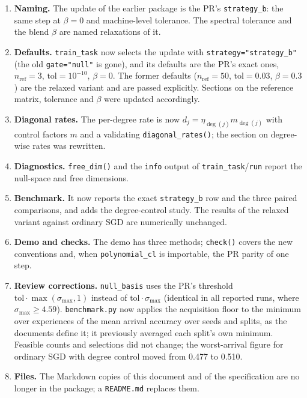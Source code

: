 \documentclass[11pt,a4paper]{article}
\newcommand{\code}[1]{\texttt{#1}}
\begin{document}
\begin{enumerate}
\item \textbf{Naming.} The update of the earlier package is the PR's \code{strategy\_b}: the same step at $\beta=0$ and machine-level tolerance. The spectral tolerance and the blend $\beta$ are named relaxations of it.
\item \textbf{Defaults.} \code{train\_task} now selects the update with \code{strategy="strategy\_b"} (the old \code{gate="null"} is gone), and its defaults are the PR's exact ones, $n_{\text{ref}}=3$, $\text{tol}=10^{-10}$, $\beta=0$. The former defaults ($n_{\text{ref}}=50$, $\text{tol}=0.03$, $\beta=0.3$) are the relaxed variant and are passed explicitly. Sections on the reference matrix, tolerance and $\beta$ were updated accordingly.
\item \textbf{Diagonal rates.} The per-degree rate is now $d_j=\eta_{\deg(j)}m_{\deg(j)}$ with control factors $m$ and a validating \code{diagonal\_rates()}; the section on degree-wise rates was rewritten.
\item \textbf{Diagnostics.} \code{free\_dim()} and the \code{info} output of \code{train\_task}/\code{run} report the null-space and free dimensions.
\item \textbf{Benchmark.} It now reports the exact \code{strategy\_b} row and the three paired comparisons, and adds the degree-control study. The results of the relaxed variant against ordinary SGD are numerically unchanged.
\item \textbf{Demo and checks.} The demo has three methods; \code{check()} covers the new conventions and, when \code{polynomial\_cl} is importable, the PR parity of one step.
\item \textbf{Review corrections.} \code{null\_basis} uses the PR's threshold $\text{tol}\cdot\max(\sigma_{\max},1)$ instead of $\text{tol}\cdot\sigma_{\max}$ (identical in all reported runs, where $\sigma_{\max}\ge4.59$). \code{benchmark.py} now applies the acquisition floor to the minimum over experiences of the mean arrival accuracy over seeds and splits, as the documents define it; it previously averaged each split's own minimum. Feasible counts and selections did not change; the worst-arrival figure for ordinary SGD with degree control moved from 0.477 to 0.510.
\item \textbf{Files.} The Markdown copies of this document and of the specification are no longer in the package; a \code{README.md} replaces them.
\end{enumerate}
\end{document}
